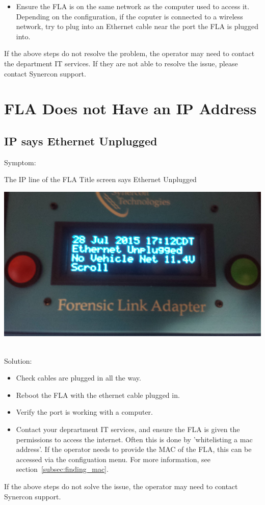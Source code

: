 \documentclass[11pt, oneside]{book}
\begin{document}
\begin{itemize}
\item Ensure the FLA is on the same network as the computer used to access it. Depending on the configuration, if the coputer is connected to a wireless network, try to plug into an Ethernet cable near the port the FLA is plugged into.
\end{itemize}
If the above steps do not resolve the problem, the operator may need to contact the department IT services. If they are not able to resolve the issue, please contact Synercon support.

\section{FLA Does not Have an IP Address}
\subsection{IP says Ethernet Unplugged}
Symptom:\\
\noindent\begin{minipage}{0.45\textwidth}%
The IP line of the FLA Title screen says Ethernet Unplugged
\end{minipage}%
\hfill%
\begin{minipage}{0.45\textwidth}
\includegraphics[width=\linewidth]{../media/fla_screens/title_screen_eth_unplug}
\end{minipage}\\
Solution:\\
\begin{itemize}
\item Check cables are plugged in all the way.
\item Reboot the FLA with the ethernet cable plugged in.
\item Verify the port is working with a computer.
\item Contact your deprartment IT services, and ensure the FLA is given the permissions to access the internet. Often this is done by 'whitelisting a mac address'. If the operator needs to provide the MAC of the FLA, this can be accessed via the configuation menu. For more information, see section~\ref{subsec:finding_mac}.
\end{itemize}
If the above steps do not solve the issue, the operator may need to contact Synercon support.
\end{document}
